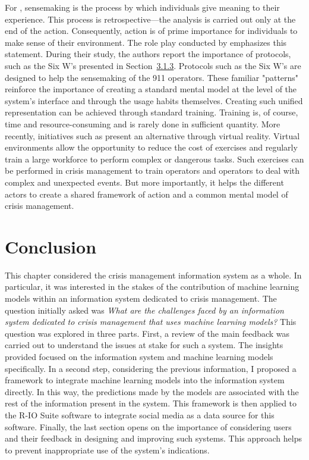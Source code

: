 For \textcite{weickSensemakingOrganizations1995}, sensemaking is the process by which individuals give meaning to their experience.
This process is retrospective—the analysis is carried out only at the end of the action.
Consequently, action is of prime importance for individuals to make sense of their environment.
The role play conducted by \textcite{graceRolePlayingNext2019} emphasizes this statement.
During their study, the authors report the importance of protocols, such as the Six W's presented in Section~\hyperref[sec:sixws]{3.1.3}.
Protocols such as the Six W's are designed to help the sensemaking of the 911 operators.
These familiar "patterns" reinforce the importance of creating a standard mental model at the level of the system's interface and through the usage habits themselves.
Creating such unified representation can be achieved through standard training.
Training is, of course, time and resource-consuming and is rarely done in sufficient quantity.
More recently, initiatives such as \textcite{congesCrisisManagementExercises2020} present an alternative through virtual reality.
Virtual environments allow the opportunity to reduce the cost of exercises and regularly train a large workforce to perform complex or dangerous tasks.
Such exercises can be performed in crisis management to train operators and operators to deal with complex and unexpected events.
But more importantly, it helps the different actors to create a shared framework of action and a common mental model of crisis management.

\section*{Conclusion}
This chapter considered the crisis management information system as a whole.
In particular, it was interested in the stakes of the contribution of machine learning models within an information system dedicated to crisis management.
The question initially asked was \emph{What are the challenges faced by an information system dedicated to crisis management that uses machine learning models?}
This question was explored in three parts.
First, a review of the main feedback was carried out to understand the issues at stake for such a system.
The insights provided focused on the information system and machine learning models specifically.
In a second step, considering the previous information, I proposed a framework to integrate machine learning models into the information system directly.
In this way, the predictions made by the models are associated with the rest of the information present in the system.
This framework is then applied to the R-IO Suite software to integrate social media as a data source for this software.
Finally, the last section opens on the importance of considering users and their feedback in designing and improving such systems.
This approach helps to prevent inappropriate use of the system's indications.

